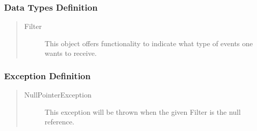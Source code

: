 \subsubsection{Data Types Definition}

\begin{quote}
	\begin{description}
		\item[Filter] This object offers functionality to indicate what type of events
		one wants to receive.
	\end{description} 
\end{quote}

\subsubsection{Exception Definition} 

\begin{quote}
	\begin{description}
		\item[NullPointerException] This exception will be thrown when the given
		Filter is the null reference.
	\end{description} 
\end{quote}
